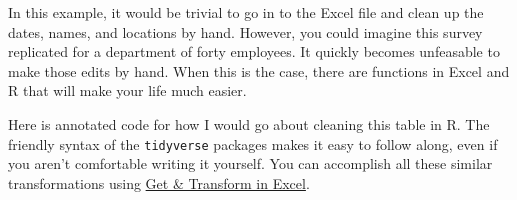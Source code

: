 \documentclass[]{book}
\begin{document}
\hypertarget{htmlwidget-216e490c2d9a95d0cebe}{}

In this example, it would be trivial to go in to the Excel file and clean up the dates, names, and locations by hand. However, you could imagine this survey replicated for a department of forty employees. It quickly becomes unfeasable to make those edits by hand. When this is the case, there are functions in Excel and R that will make your life much easier.

Here is annotated code for how I would go about cleaning this table in R. The friendly syntax of the \texttt{tidyverse} packages makes it easy to follow along, even if you aren't comfortable writing it yourself. You can accomplish all these similar transformations using \href{https://support.microsoft.com/en-us/office/power-query-101-008b3f46-5b14-4f8b-9a07-d3da689091b5}{Get \& Transform in Excel}.
\end{document}
